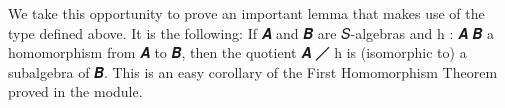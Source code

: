 We take this opportunity to prove an important lemma that makes use of the  type defined above. It is the following: If \ab 𝑨 and \ab 𝑩 are \ab 𝑆-algebras and \ab h \as :  \ab 𝑨 \ab 𝑩 a homomorphism from \ab 𝑨 to \ab 𝑩, then the quotient \ab 𝑨 \af ╱  \ab h is (isomorphic to) a subalgebra of \ab 𝑩. This is an easy corollary of the First Homomorphism Theorem proved in the \ualibNoether module.
\ccpad
\begin{code}%
\>[0]\AgdaSpace{}%
\AgdaSymbol{:}%
\>[103I]\AgdaSymbol{\{}\AgdaSpace{}%
\AgdaSpace{}%
\AgdaSymbol{:}\AgdaSpace{}%
\AgdaSymbol{\}}\<%
\\
\>[.][@{}l@{}]\<[103I]%
\>[20]\AgdaComment{--}\AgdaSpace{}%
\>[104I]
\\
\>[0][@{}l@{\AgdaIndent{0}}]%
\>[1]%
\>[.][@{}l@{}]\<[104I]%
\>[22]\AgdaSpace{}%
\AgdaSpace{}%
\AgdaSpace{}%
\AgdaSpace{}%
\AgdaSpace{}%
\AgdaSpace{}%
\<%
\\
%
\\[\AgdaEmptyExtraSkip]%
%
\>[1]%
\>[20]\AgdaSymbol{(}\AgdaSpace{}%
\AgdaSymbol{:}\AgdaSpace{}%
\AgdaSpace{}%
\AgdaSpace{}%
\AgdaSymbol{)(}\AgdaSpace{}%
\AgdaSymbol{:}\AgdaSpace{}%
\AgdaSpace{}%
\AgdaSpace{}%
\AgdaSymbol{)(}\AgdaSpace{}%
\AgdaSymbol{:}\AgdaSpace{}%
\AgdaSpace{}%
\AgdaSpace{}%
\AgdaSymbol{)}\<%
\\
%
\\[\AgdaEmptyExtraSkip]%
%
\>[20]\AgdaComment{--}\AgdaSpace{}%
\>[22]\<%
\\
%
\>[1]%
\>[22]\AgdaSpace{}%
\AgdaSpace{}%
\AgdaSpace{}%
\<%
\\
%
\>[1]%
\>[22]\AgdaSpace{}%
\AgdaSpace{}%
\AgdaSpace{}%
\AgdaSpace{}%
\AgdaSpace{}%
\AgdaSymbol{(}\AgdaSpace{}%
\AgdaSpace{}%
\AgdaSpace{}%
\AgdaSpace{}%
\AgdaSpace{}%
\AgdaSpace{}%

\end{code}
